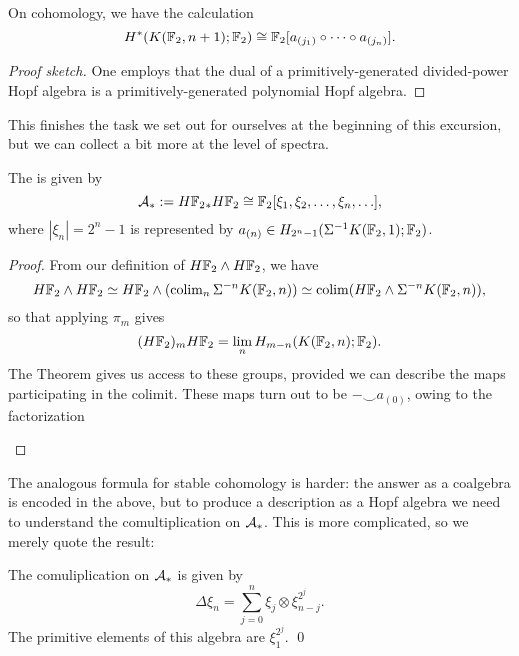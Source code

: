 \begin{corollary}
On cohomology, we have the calculation \[H^*(K(\mathbb F_2, n+1); \mathbb F_2) \cong \mathbb F_2[a_{(j_1)} \circ \cdots \circ a_{(j_n)}].\]
\end{corollary}
\begin{proof}[Proof sketch]
One employs that the dual of a primitively-generated divided-power Hopf algebra is a primitively-generated polynomial Hopf algebra.
\end{proof}

\noindent
This finishes the task we set out for ourselves at the beginning of this excursion, but we can collect a bit more at the level of spectra.

\begin{corollary}
The  is given by \[\mathcal A_* := H\mathbb F_2{}_* H\mathbb F_2 \cong \mathbb F_2[\xi_1, \xi_2, \ldots, \xi_n, \ldots],\] where $|\xi_n| = 2^n - 1$ is represented by $a_{(n)} \in H_{2^n-1}(\Sigma^{-1} K(\mathbb F_2, 1); \mathbb F_2)$.
\end{corollary}
\begin{proof}
From our definition of $H\mathbb F_2 \wedge H\mathbb F_2$, we have \[H\mathbb F_2 \wedge H\mathbb F_2 \simeq H\mathbb F_2 \wedge (\operatorname{colim}_n \Sigma^{-n} K(\mathbb F_2, n)) \simeq \operatorname{colim} (H\mathbb F_2 \wedge \Sigma^{-n} K(\mathbb F_2, n)),\] so that applying $\pi_m$ gives \[(H\mathbb F_2)_m H\mathbb F_2 = \lim_n H_{m-n}(K(\mathbb F_2, n); \mathbb F_2).\]
The Theorem gives us access to these groups, provided we can describe the maps participating in the colimit.
These maps turn out to be $- \smile a_{(0)}$, owing to the factorization
\begin{center}
\end{center}
\end{proof}

The analogous formula for stable cohomology is harder: the answer as a coalgebra is encoded in the above, but to produce a description as a Hopf algebra we need to understand the comultiplication on $\mathcal A_*$.
This is more complicated, so we merely quote the result:
\begin{lemma}
The comuliplication on $\mathcal A_*$ is given by
\[\Delta \xi_n = \sum_{j=0}^n \xi_j \otimes \xi_{n-j}^{2^j}.\]
The primitive elements of this algebra are $\xi_1^{2^j}$.
\qed
\end{lemma}

